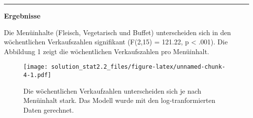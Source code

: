 \documentclass[
]{article}
\begin{document}
\begin{center}\rule{0.5\linewidth}{0.5pt}\end{center}

\textbf{Ergebnisse}

Die Menüinhalte (Fleisch, Vegetarisch und Buffet) unterscheiden sich in
den wöchentlichen Verkaufszahlen signifikant (F(2,15) = 121.22, p
\textless{} .001). Die Abbildung 1 zeigt die wöchentlichen
Verkaufszahlen pro Menüinhalt.

\begin{figure}
\centering
\texttt{[image: solution\_stat2.2\_files/figure-latex/unnamed-chunk-4-1.pdf]}
\caption{Die wöchentlichen Verkaufzahlen unterscheiden sich je nach
Menüinhalt stark. Das Modell wurde mit den log-tranformierten Daten
gerechnet.}
\end{figure}
\end{document}
